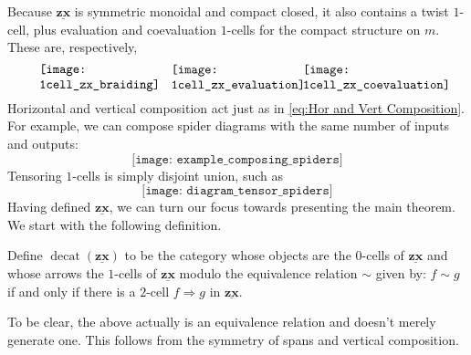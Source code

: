 \documentclass[a4paper,UKenglish]{lipics-v2016}
\begin{document}
Because $\underline{\mathbf{zx}}$ is symmetric monoidal and compact closed, it also contains a twist $1$-cell, plus evaluation and coevaluation $1$-cells for the compact structure on $m$.  These are, respectively, 
\begin{equation}
\label{diag:TwistCompact 1cells}
	\begin{minipage}{0.3\textwidth}
		\texttt{[image: 1cell\_zx\_braiding]}
	\end{minipage}
	\begin{minipage}{0.3\textwidth}
		\texttt{[image: 1cell\_zx\_evaluation]}
	\end{minipage}
	\begin{minipage}{0.3\textwidth}
		\texttt{[image: 1cell\_zx\_coevaluation]}
	\end{minipage}
\end{equation}
Horizontal and vertical composition act just as in \eqref{eq:Hor and Vert Composition}. For example, we can compose spider diagrams with the same number of inputs and outputs:
\[
\texttt{[image: example\_composing\_spiders]}
\]
Tensoring $1$-cells is simply disjoint union, such as
\[
\texttt{[image: diagram\_tensor\_spiders]}
\]
Having defined $\underline{\mathbf{zx}}$, we can turn our focus towards presenting the main theorem. We start with the following definition.

\begin{definition}
	\label{def:decat zx}
	Define $\operatorname{decat}(\underline{\mathbf{zx}})$ to be the category whose objects are the $0$-cells of $\underline{\mathbf{zx}}$ and whose arrows the $1$-cells of $\underline{\mathbf{zx}}$ modulo the equivalence relation $\sim$ given by: $f \sim g$ if and only if there is a $2$-cell $f \Rightarrow g$ in $\underline{\mathbf{zx}}$.
\end{definition}

To be clear, the above actually is an equivalence relation and doesn't merely generate one.  This follows from the symmetry of spans and vertical composition.   
\end{document}
